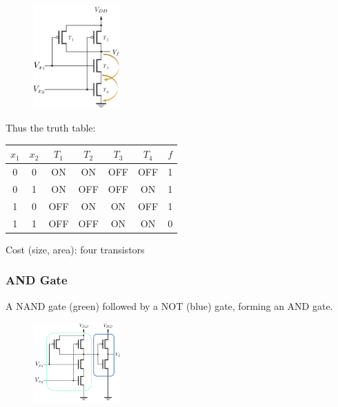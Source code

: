 \documentclass[12pt,openany, tikz,border=10pt]{book}
\begin{document}
      \begin{figure}[h]
      \centering
      \includegraphics[width=0.3\textwidth]{circuits/9.1.5_2.png} %
      \end{figure}
      

      Thus the truth table: 
      \begin{center}
      \begin{tabular}{ |c|c||c|c|c|c||c| }
      \hline
      \( x_1 \) & \( x_2 \) & \( T_1 \) & \( T_2 \) & \( T_3 \) & \( T_4 \) & \( f \) \\
      \hline
      0 & 0 & ON & ON & OFF & OFF & 1 \\
      0 & 1 & ON & OFF & OFF & ON & 1 \\
      1 & 0 & OFF & ON & ON & OFF & 1 \\
      1 & 1 & OFF & OFF & ON & ON & 0 \\
      \hline
      \end{tabular}
      \end{center}
      
      Cost (size, area): four transistors

      \subsubsection{AND Gate}
        A NAND gate (green) followed by a NOT (blue) gate, forming an AND gate.
       \begin{figure}[h]
        \centering
        \includegraphics[width=0.3\textwidth]{circuits/9.1.5_3.png}
        \end{figure}
        
\end{document}
